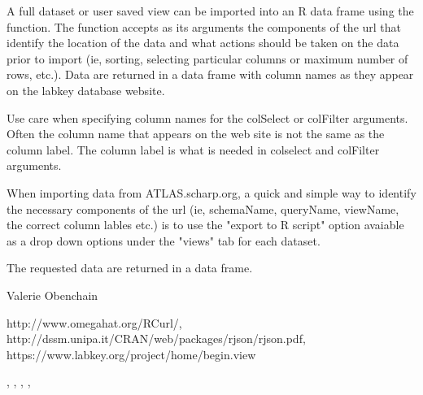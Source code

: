 \begin{Details}\relax
A full dataset or user saved view can be imported into an R data frame using the  
function. The function accepts as its arguments the components of the url that identify
the location of the data and what actions should be taken on the data prior to import
(ie, sorting, selecting particular columns or maximum number of rows, etc.). Data are returned in a data 
frame with column names as they appear on the labkey database website. 

Use care when specifying column names for the colSelect or colFilter arguments. Often the column name
that appears on the web site is not the same as the column label. The column label is what is needed in
colselect and colFilter arguments. 

When importing data from ATLAS.scharp.org, a quick and simple way to identify the necessary components of the url 
(ie, schemaName, queryName, viewName, the correct column lables etc.) is to use the "export to R script" option avaiable as a drop down options under the "views" tab for each dataset.
\end{Details}
\begin{Value}
The requested data are returned in a data frame.
\end{Value}
\begin{Author}\relax
Valerie Obenchain
\end{Author}
\begin{References}\relax
http://www.omegahat.org/RCurl/,\\ 
http://dssm.unipa.it/CRAN/web/packages/rjson/rjson.pdf,\\
https://www.labkey.org/project/home/begin.view
\end{References}
\begin{SeeAlso}\relax
{}, , , 
, 
\end{SeeAlso}

